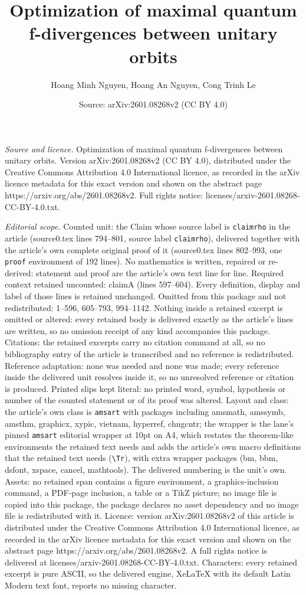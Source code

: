 \documentclass[10pt,a4paper]{amsart}
\title[Optimization of maximal quantum f-divergences between unitar]{Optimization of maximal quantum f-divergences between unitary orbits}
\author{Hoang Minh Nguyen, Hoang An Nguyen, Cong Trinh Le}
\date{Source: arXiv:2601.08268v2 (CC BY 4.0)}
\begin{document}
\maketitle

\noindent\emph{Source and licence.} Optimization of maximal quantum f-divergences between unitary orbits. Version arXiv:2601.08268v2 (CC BY 4.0), distributed under the Creative Commons Attribution 4.0 International licence, as recorded in the arXiv licence metadata for this exact version and shown on the abstract page https://arxiv.org/abs/2601.08268v2. Full rights notice: licenses/arxiv-2601.08268-CC-BY-4.0.txt.\par\smallskip

\noindent\textit{Editorial scope.} Counted unit: the Claim whose source label is \texttt{claimrho} in the article (source0.tex lines 794--801, source label \texttt{claimrho}), delivered together with the article's own complete original proof of it (source0.tex lines 802--993, one \texttt{proof} environment of 192 lines). No mathematics is written, repaired or re-derived: statement and proof are the article's own text line for line. Required context retained uncounted: claimA (lines 597--604). Every definition, display and label of those lines is retained unchanged. Omitted from this package and not redistributed: 1--596, 605--793, 994--1142. Nothing inside a retained excerpt is omitted or altered: every retained body is delivered exactly as the article's lines are written, so no omission receipt of any kind accompanies this package. Citations: the retained excerpts carry no citation command at all, so no bibliography entry of the article is transcribed and no reference is redistributed. Reference adaptation: none was needed and none was made; every reference inside the delivered unit resolves inside it, so no unresolved reference or citation is produced. Printed slips kept literal: no printed word, symbol, hypothesis or number of the counted statement or of its proof was altered. Layout and class: the article's own class is \texttt{amsart} with packages including amsmath, amssymb, amsthm, graphicx, xypic, vietnam, hyperref, chngcntr; the wrapper is the lane's pinned \texttt{amsart} editorial wrapper at 10pt on A4, which restates the theorem-like environments the retained text needs and adds the article's own macro definitions that the retained text needs (\texttt{\textbackslash Tr}), with extra wrapper packages (bm, bbm, dsfont, xspace, cancel, mathtools). The delivered numbering is the unit's own. Assets: no retained span contains a figure environment, a graphics-inclusion command, a PDF-page inclusion, a table or a TikZ picture; no image file is copied into this package, the package declares no asset dependency and no image file is redistributed with it. Licence: version arXiv:2601.08268v2 of this article is distributed under the Creative Commons Attribution 4.0 International licence, as recorded in the arXiv licence metadata for this exact version and shown on the abstract page https://arxiv.org/abs/2601.08268v2. A full rights notice is delivered at licenses/arxiv-2601.08268-CC-BY-4.0.txt. Characters: every retained excerpt is pure ASCII, so the delivered engine, XeLaTeX with its default Latin Modern text font, reports no missing character.
\end{document}
